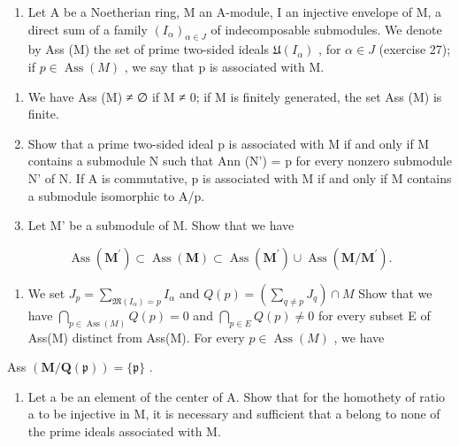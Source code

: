 \begin{enumerate}
\def\labelenumi{\arabic{enumi})}
\setcounter{enumi}{27}
\tightlist
\item
  Let A be a Noetherian ring, M an A-module, I an injective envelope of M, a direct sum of a family \((I_{\alpha})_{\alpha \in J}\) of indecomposable submodules. We denote by Ass (M) the set of prime two-sided ideals \(\mathfrak{U}(I_{\alpha})\) , for \(\alpha \in J\) (exercise 27); if \(p \in \operatorname{Ass}(M)\) , we say that p is associated with M.
\end{enumerate}

\begin{enumerate}
\def\labelenumi{\alph{enumi})}
\item
  We have Ass (M) ≠ ∅ if M ≠ 0; if M is finitely generated, the set Ass (M) is finite.
\item
  Show that a prime two-sided ideal p is associated with M if and only if M contains a submodule N such that Ann (N') = p for every nonzero submodule N' of N. If A is commutative, p is associated with M if and only if M contains a submodule isomorphic to A/p.
\item
  Let M' be a submodule of M. Show that we have
\end{enumerate}

\[
\operatorname{Ass} \left(\mathbf {M} ^ {\prime}\right) \subset \operatorname{Ass} (\mathbf {M}) \subset \operatorname{Ass} \left(\mathbf {M} ^ {\prime}\right) \cup \operatorname{Ass} \left(\mathbf {M} / \mathbf {M} ^ {\prime}\right).
\]

\begin{enumerate}
\def\labelenumi{\alph{enumi})}
\setcounter{enumi}{3}
\tightlist
\item
  We set \(J_{p} = \sum_{\mathfrak{M}(I_{\alpha}) = p} I_{\alpha}\) and \(Q(p) = \left( \sum_{q \neq p} J_{q} \right) \cap M\) Show that we have \(\bigcap_{p \in \operatorname{Ass}(M)} Q(p) = 0\) and \(\bigcap_{p \in E} Q(p) \neq 0\) for every subset E of Ass(M) distinct from Ass(M). For every \(p \in \operatorname{Ass}(M)\) , we have
\end{enumerate}

Ass \((\mathbf{M} / \mathbf{Q}(\mathfrak{p})) = \{\mathfrak{p}\}\) .

\begin{enumerate}
\def\labelenumi{\alph{enumi})}
\setcounter{enumi}{4}
\tightlist
\item
  Let a be an element of the center of A. Show that for the homothety of ratio a to be injective in M, it is necessary and sufficient that a belong to none of the prime ideals associated with M.
\end{enumerate}

